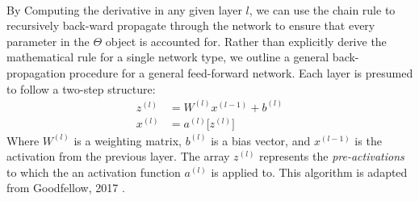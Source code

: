 \documentclass[12pt,letterpaper]{article}
\begin{document}
\paragraph*{}By Computing the derivative in any given layer $l$, we can use the chain rule to recursively back-ward propagate through the network to ensure that every parameter in the $\Theta$ object is accounted for. Rather than explicitly derive the mathematical rule for a single network type, we outline a general back-propagation procedure for a general feed-forward network. Each layer is presumed to follow a two-step structure:
\begin{equation}
\begin{split}
z^{(l)} &=  W^{(l)} x^{(l-1)} + b^{(l)} \\
x^{(l)} &= a^{(l)} \big[ z^{(l)} \big]
\end{split}
\end{equation}
Where $W^{(l)}$ is a weighting matrix, $b^{(l)}$ is a bias vector, and $x^{(l-1)}$ is the activation from the previous layer. The array $z^{(l)}$ represents the \textit{pre-activations} to which the an activation function $a^{(l)}$ is applied to. This algorithm is adapted from Goodfellow, 2017 \cite{Goodfellow}.
\end{document}
